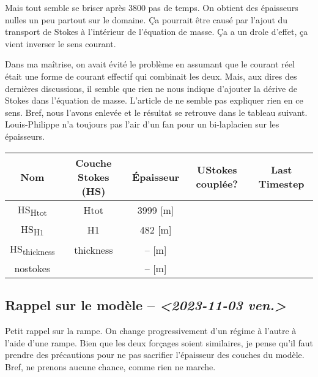 \documentclass[10pt]{article}
\numberwithin{equation}{section}
\newcommand{\cmark}{\ding{52}}
\newcommand{\xmark}{\ding{55}}
\begin{document}
Mais tout semble se briser après 3800 pas de temps.
On obtient des épaisseurs nulles un peu partout sur le domaine.
Ça pourrait être causé par l'ajout du transport de Stokes à l'intérieur de l'équation de masse.
Ça a un drole d'effet, ça vient inverser le sens courant. \bigskip

Dans ma maîtrise, on avait évité le problème en assumant que le courant réel était une forme de courant effectif qui combinait les deux.
Mais, aux dires des dernières discussions, il semble que rien ne nous indique d'ajouter la dérive de Stokes dans l'équation de masse.
L'article de  ne semble pas expliquer rien en ce sens.
Bref, nous l'avons enlevée et le résultat se retrouve dans le tableau suivant.
Louis-Philippe n'a toujours pas l'air d'un fan pour un bi-laplacien sur les épaisseurs.

\begin{center}
\begin{tabular}{ccccc}
Nom & Couche Stokes (HS) & Épaisseur & UStokes couplée? & Last Timestep\\[0pt]
\hline
\hline
HS\textsubscript{Htot} & Htot & 3999 [m] & \cmark & \\[0pt]
HS\textsubscript{H1} & H1 & 482 [m] & \cmark & \\[0pt]
HS\textsubscript{thickness} & thickness & -- [m] & \cmark & \\[0pt]
nostokes & \xmark & -- [m] & \xmark & \\[0pt]
\hline
\end{tabular}
\end{center}

\subsection{Rappel sur le modèle -- \textit{<2023-11-03 ven.>}}
\label{sec:org5549b57}

Petit rappel sur la rampe.
On change progressivement d'un régime à l'autre à l'aide d'une rampe.
Bien que les deux forçages soient similaires, je pense qu'il faut prendre des précautions pour ne pas sacrifier l'épaisseur des couches du modèle.
Bref, ne prenons aucune chance, comme rien ne marche.
\end{document}
